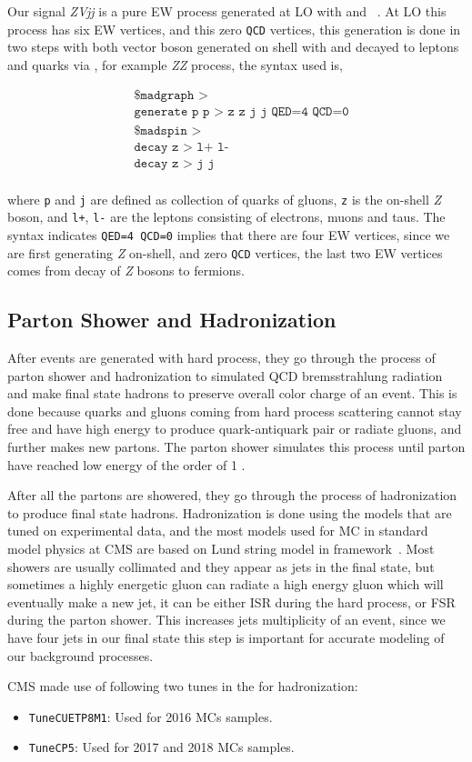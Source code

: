 Our signal \textit{ZVjj} is a pure \gls{EW} process generated
at \gls{LO} with \MGvATNLO{} and \MADSPIN{}~\cite{madgraph,madspin}.
At \gls{LO} this process has six \gls{EW} vertices, and this
zero \texttt{QCD} vertices, this generation is done
in two steps with both vector boson generated on shell
with \MADGRAPH{} and decayed to leptons and quarks via \MADSPIN{},
for example \textit{ZZ} process, the syntax used is,

\begin{align*}
   & \texttt{\$ madgraph >}                      \\
   & \texttt{generate p p > z z j j QED=4 QCD=0} \\
   & \texttt{\$ madspin >}                       \\
   & \texttt{decay z > l+ l-}                    \\
   & \texttt{decay z > j j}                      \\
\end{align*}

where \texttt{p} and \texttt{j} are defined as collection of quarks of gluons,
\texttt{z} is the on-shell \textit{Z} boson, and \texttt{l+}, \texttt{l-}
are the leptons consisting of electrons, muons and taus. The syntax
indicates \texttt{QED=4 QCD=0} implies that there are four \gls{EW}
vertices, since we are first generating \textit{Z} on-shell, and zero
\texttt{QCD} vertices, the last two \gls{EW} vertices comes from
decay of \textit{Z} bosons to fermions.

\subsection{
  Parton Shower and Hadronization
}

After events are generated with hard process,
they go through the process of parton shower and hadronization
to simulated QCD bremsstrahlung radiation
and make final state hadrons to preserve overall color charge of an event.
This is done because quarks and gluons coming from hard process scattering
cannot stay free and have high energy to produce quark-antiquark
pair or radiate gluons, and further makes new partons.
The parton shower simulates this process until parton
have reached low energy of the order of 1 \GeV{}.

After all the partons are showered, they go through the process of
hadronization to produce final state hadrons.
Hadronization is done using the models that are tuned on experimental data,
and the most models used for \gls{MC} in standard model physics at \gls{CMS}
are based on Lund string model in \PYTHIA{} framework~\cite{pythia}.
Most showers are usually collimated and they appear
as jets in the final state, but sometimes a highly energetic gluon
can radiate a high energy gluon which will eventually
make a new jet, it can be either \gls{ISR} during the hard process,
or \gls{FSR} during the parton shower.
This increases jets multiplicity of an event,
since we have four jets in our final state this step is important for
accurate modeling of our background processes.

\gls{CMS} made use of following two tunes in the \PYTHIA{} for hadronization:

\begin{itemize}
  \item \texttt{TuneCUETP8M1}: Used for 2016 \glspl{MC} samples.
  \item \texttt{TuneCP5}: Used for 2017 and 2018 \glspl{MC} samples.
\end{itemize}